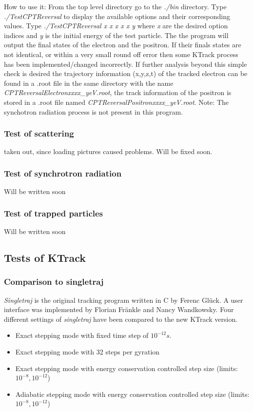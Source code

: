     How to use it: From the top level directory go to the \textit{./bin} directory. Type \textit{./TestCPTReversal} to display the available
    options and their corresponding values. Type \textit{./TestCPTReversal x x x x x y} where \textit{x} are the desired option indices
    and \textit{y} is the initial energy of the test particle. The the program will output the final states of the electron and the positron. 
    If their finals states are not identical, or within a very small round off error then some KTrack process has been implemented/changed 
    incorrectly. If further analysis beyond this simple check is desired the trajectory information (x,y,z,t) of the tracked electron
    can be found in a .root file in the same directory with the name \textit{CPTReversalElectronxxxx\_yeV.root}, the track information of 
    the positron is stored in a .root file named \textit{CPTReversalPositronxxxx\_yeV.root}. 
    Note: The synchotron radiation process is not present in this program.      
    
    \subsubsection*{Test of scattering}
    \label{testscatter}
    taken out, since loading pictures caused problems. Will be fixed soon.


    \subsubsection*{Test of synchrotron radiation}
    \label{testtrapped}
    Will be written soon

    
    \subsubsection*{Test of trapped particles}
    \label{testtrapped}
    Will be written soon

\subsection{Tests of KTrack}
    \subsubsection*{Comparison to singletraj}
    
    \textit{Singletraj} is the original tracking program written in C by Ferenc Gl\"uck. A user interface was implemented by Florian Fr\"ankle and Nancy Wandkowsky.
    Four different settings of \textit{singletraj} have been compared to the new KTrack version. 
    \begin{itemize}
        \item Exact stepping mode with fixed time step of $10^{-12} s $.
        \item Exact stepping mode with 32 steps per gyration
        \item Exact stepping mode with energy conservation controlled step size (limits: $10^{-8}, 10^{-12}$)
        \item Adiabatic stepping mode with energy conservation controlled step size (limits: $10^{-8}, 10^{-12}$)
    \end{itemize}
    
